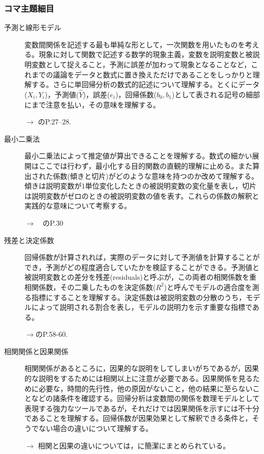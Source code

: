\subsubsection{コマ主題細目}
\begin{description}
	\item[予測と線形モデル] 変数間関係を記述する最も単純な形として，一次関数を用いたものを考える。現象に対して関数で記述する数学的現象主義，変数を説明変数と被説明変数として捉えること，予測に誤差が加わって現象となることなど，これまでの議論をデータと数式に置き換えただけであることをしっかりと理解する。さらに単回帰分析の数式的記述について理解する。とくにデータ($X_i,Y_i$)，予測値($\hat{Y}$)，誤差($e_i$)，回帰係数($b_0,b_1$)として表される記号の細部にまで注意を払い，その意味を理解する。
	      \begin{flushright}
		      $\to$ \textcite{Toyoda201706}のP.27--28.
	      \end{flushright}

	\item[最小二乗法] 最小二乗法によって推定値が算出できることを理解する。数式の細かい展開はここでは行わず，最小化する目的関数の直観的理解に止める。また算出された係数(傾きと切片)がどのような意味を持つのか改めて理解する。傾きは説明変数が1単位変化したときの被説明変数の変化量を表し，切片は説明変数がゼロのときの被説明変数の値を表す。これらの係数の解釈と実践的な意味について考察する。
	      \begin{flushright}
		      $\to$　\textcite{Toyoda201706}のP.30
	      \end{flushright}

	\item[残差と決定係数] 回帰係数が計算されれば，実際のデータに対して予測値を計算することができ，予測がどの程度適合していたかを検証することができる。予測値と被説明変数との差分を残差(residuals)と呼ぶが，この両者の相関係数を重相関係数，その二乗したものを決定係数($R^2$)と呼んでモデルの適合度を測る指標にすることを理解する。決定係数は被説明変数の分散のうち，モデルによって説明される割合を表し，モデルの説明力を示す重要な指標である。
	      \begin{flushright}
		      $\to$\textcite{Nojima201903}のP.58-60.
	      \end{flushright}

	\item[相関関係と因果関係] 相関関係があるところに，因果的な説明をしてしまいがちであるが，因果的な説明をするためには相関以上に注意が必要である。因果関係を見るために必要な，時間的先行性，他の原因がないこと，他の結果に至らないことなどの諸条件を確認する。回帰分析は変数間の関係を数理モデルとして表現する強力なツールであるが，それだけでは因果関係を示すには不十分であることを理解する。回帰係数が因果効果として解釈できる条件と，そうでない場合の違いについて理解する。
	      \begin{flushright}
		      $\to$ 相関と因果の違いについては，\textcite{Toyoda1992}に簡潔にまとめられている。
	      \end{flushright}

\end{description}

